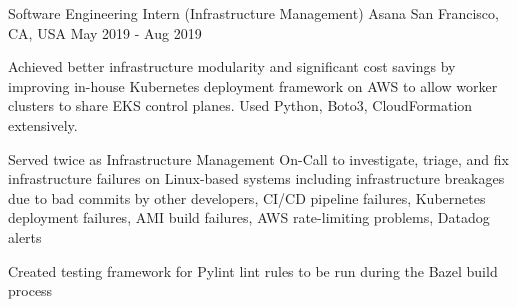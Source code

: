 \begin{cventries}
  \cventry
  {Software Engineering Intern (Infrastructure Management)} %
    {Asana} %
    {San Francisco, CA, USA} %
    {May 2019 - Aug 2019} %
    {
      \begin{cvitems} %
      \item {Achieved better infrastructure modularity and significant cost savings by improving in-house Kubernetes deployment framework on AWS to allow worker clusters to share EKS control planes. Used Python, Boto3, CloudFormation extensively.}
      \item {Served twice as Infrastructure Management On-Call to investigate, triage, and fix infrastructure failures on Linux-based systems including infrastructure breakages due to bad commits by other developers, CI/CD pipeline failures, Kubernetes deployment failures, AMI build failures, AWS rate-limiting problems, Datadog alerts}
      \item {Created testing framework for Pylint lint rules to be run during the Bazel build process}
      \end{cvitems}
    }


\end{cventries}
